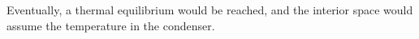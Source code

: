 Eventually, a thermal equilibrium would be reached, and the interior space would assume the temperature in the condenser.
